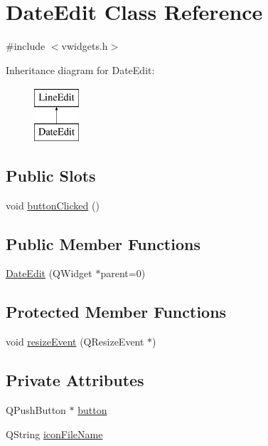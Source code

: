 \hypertarget{classDateEdit}{
\section{DateEdit Class Reference}
\label{classDateEdit}
}


{\ttfamily \#include $<$vwidgets.h$>$}

Inheritance diagram for DateEdit:\begin{figure}[H]
\begin{center}
\leavevmode
\includegraphics[height=2.000000cm]{classDateEdit}
\end{center}
\end{figure}
\subsection*{Public Slots}
\begin{DoxyCompactItemize}
\item 
void \hyperlink{classDateEdit_a4f16955de169de197867b3298592ce3e}{buttonClicked} ()
\end{DoxyCompactItemize}
\subsection*{Public Member Functions}
\begin{DoxyCompactItemize}
\item 
\hyperlink{classDateEdit_a2419b5b3044083ab297107966ba4b310}{DateEdit} (QWidget $\ast$parent=0)
\end{DoxyCompactItemize}
\subsection*{Protected Member Functions}
\begin{DoxyCompactItemize}
\item 
void \hyperlink{classDateEdit_a84296994dc057b587ea9542604a3e050}{resizeEvent} (QResizeEvent $\ast$)
\end{DoxyCompactItemize}
\subsection*{Private Attributes}
\begin{DoxyCompactItemize}
\item 
QPushButton $\ast$ \hyperlink{classDateEdit_a54dc3b413c28dac9aa044d185b17bccf}{button}
\item 
QString \hyperlink{classDateEdit_a79214d87b36dc55ec6f783fa287d238d}{iconFileName}
\end{DoxyCompactItemize}


